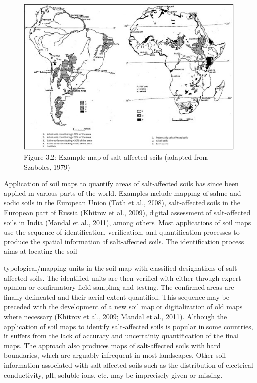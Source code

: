 \documentclass[
  10pt,
  b5paper,
]{book}
\begin{document}
\begin{figure}
\centering
\includegraphics{figures/images/Figure3.2.jpg}
\caption{Figure 3.2: Example map of salt-affected soils (adapted from Szabolcs, 1979)}
\end{figure}

Application of soil maps to quantify areas of salt-affected soils has since been applied in various parts of the world. Examples include mapping of saline and sodic soils in the European Union (Toth et al., 2008), salt-affected soils in the European part of Russia (Khitrov et al., 2009), digital assessment of salt-affected soils in India (Mandal et al., 2011), among others.
Most applications of soil maps use the sequence of identification, verification, and quantification processes to produce the spatial information of salt-affected soils. The identification process aims at locating the soil

typological/mapping units in the soil map with classified designations of salt-affected soils. The identified units are then verified with either through expert opinion or confirmatory field-sampling and testing. The confirmed areas are finally delineated and their aerial extent quantified. This sequence may be preceded with the development of a new soil map or digitalization of old maps where necessary (Khitrov et al., 2009; Mandal et al., 2011).
Although the application of soil maps to identify salt-affected soils is popular in some countries, it suffers from the lack of accuracy and uncertainty quantification of the final maps. The approach also produces maps of salt-affected soils with hard boundaries, which are arguably infrequent in most landscapes. Other soil information associated with salt-affected soils such as the distribution of electrical conductivity, pH, soluble ions, etc. may be imprecisely given or missing.
\end{document}
